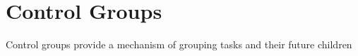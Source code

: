 
\section{Control Groups}

Control groups provide a mechanism of grouping tasks and their future children 

